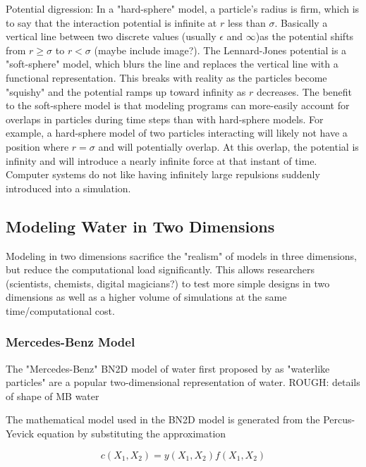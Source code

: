 Potential digression:
In a "hard-sphere" model, a particle's radius is firm, which is to say that the interaction potential is infinite at $r$ less than $\sigma$. 
Basically a vertical line between two discrete values (usually $\epsilon$ and $\infty$)as the potential shifts from $r \geq \sigma$ to $r < \sigma$ (maybe include image?).
The Lennard-Jones potential is a "soft-sphere" model, which blurs the line and replaces the vertical line with a functional representation. 
This breaks with reality as the particles become "squishy" and the potential ramps up toward infinity as $r$ decreases. 
The benefit to the soft-sphere model is that modeling programs can more-easily account for overlaps in particles during time steps than with hard-sphere models. 
For example, a hard-sphere model of two particles interacting will likely not have a position where $r = \sigma$ and will potentially overlap. 
At this overlap, the potential is infinity and will introduce a nearly infinite force at that instant of time. 
Computer systems do not like having infinitely large repulsions suddenly introduced into a simulation. 


\subsection{Modeling Water in Two Dimensions}

Modeling in two dimensions sacrifice the "realism" of models in three dimensions, but reduce the computational load significantly.
This allows researchers (scientists, chemists, digital magicians?) to test more simple designs in two dimensions as well as a higher volume of simulations at the same time/computational cost. 


\subsubsection{Mercedes-Benz Model}

The "Mercedes-Benz" BN2D model of water first proposed by \cite{MBWater} as "waterlike particles" are a popular two-dimensional representation of water. 
ROUGH:
details of shape of MB water

The mathematical model used in the BN2D model is generated from the Percus-Yevick equation by substituting the approximation

\begin{equation}
c(X_{1}, X_{2}) = y(X_{1}, X_{2})f(X_{1}, X_{2})
\end{equation}

